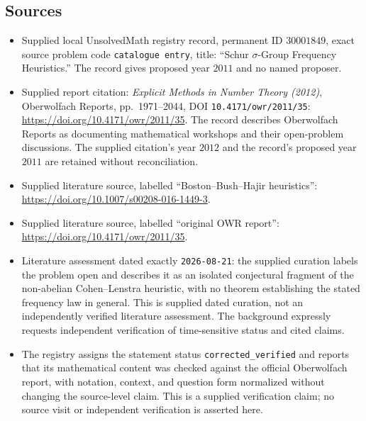 \documentclass[11pt]{article}
\begin{document}
\subsection{Sources}
\begin{itemize}
\item Supplied local UnsolvedMath registry record, permanent ID \(30001849\), exact source problem code \texttt{catalogue entry}, title: ``Schur \(\sigma\)-Group Frequency Heuristics.'' The record gives proposed year \(2011\) and no named proposer.
\item Supplied report citation: \emph{Explicit Methods in Number Theory (2012)}, Oberwolfach Reports, pp.\ 1971--2044, DOI \texttt{10.4171/owr/2011/35}: \url{https://doi.org/10.4171/owr/2011/35}. The record describes Oberwolfach Reports as documenting mathematical workshops and their open-problem discussions. The supplied citation's year \(2012\) and the record's proposed year \(2011\) are retained without reconciliation.
\item Supplied literature source, labelled ``Boston--Bush--Hajir heuristics'': \url{https://doi.org/10.1007/s00208-016-1449-3}.
\item Supplied literature source, labelled ``original OWR report'': \url{https://doi.org/10.4171/owr/2011/35}.
\item Literature assessment dated exactly \texttt{2026-08-21}: the supplied curation labels the problem open and describes it as an isolated conjectural fragment of the non-abelian Cohen--Lenstra heuristic, with no theorem establishing the stated frequency law in general. This is supplied dated curation, not an independently verified literature assessment. The background expressly requests independent verification of time-sensitive status and cited claims.
\item The registry assigns the statement status \texttt{corrected\_verified} and reports that its mathematical content was checked against the official Oberwolfach report, with notation, context, and question form normalized without changing the source-level claim. This is a supplied verification claim; no source visit or independent verification is asserted here.
\end{itemize}
\end{document}
